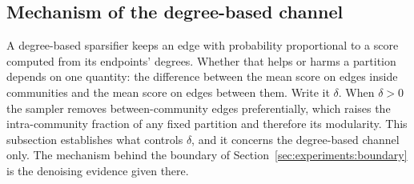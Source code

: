%
%

\subsection{Mechanism of the degree-based channel}\label{sec:experiments:mechanism}

A degree-based sparsifier keeps an edge with probability proportional to a score
computed from its endpoints' degrees. Whether that helps or harms a partition
depends on one quantity: the difference between the mean score on edges inside
communities and the mean score on edges between them. Write it $\delta$. When
$\delta > 0$ the sampler removes between-community edges preferentially, which
raises the intra-community fraction of any fixed partition and therefore its
modularity. This subsection establishes what controls $\delta$, and it concerns
the degree-based channel only. The mechanism behind the boundary of
Section~\ref{sec:experiments:boundary} is the denoising evidence given there.

